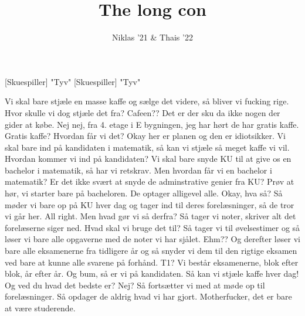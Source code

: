 \documentclass[a4paper,11pt]{article}
\title{The long con}
\author{Niklas '21 \& Thais '22}
\begin{document}
\maketitle

\begin{roles}
[Skuespiller] "Tyv"
[Skuespiller] "Tyv"
\end{roles}

\begin{sketch}
 Vi skal bare stjæle en masse kaffe og sælge det videre, så bliver vi fucking rige.
 Hvor skulle vi dog stjæle det fra? Cafeen?? Det er der sku da ikke nogen der gider at købe.
 Nej nej, fra 4. etage i E bygningen, jeg har hørt de har gratis kaffe.
 Gratis kaffe? Hvordan får vi det?
 Okay her er planen og den er idiotsikker. Vi skal bare ind på kandidaten i matematik, så kan vi stjæle så meget kaffe vi vil.
 Hvordan kommer vi ind på kandidaten?
 Vi skal bare snyde KU til at give os en bachelor i matematik, så har vi retskrav.
 Men hvordan får vi en bachelor i matematik? Er det ikke svært at snyde de adminstrative genier fra KU?
 Prøv at hør, vi starter bare på bacheloren. De optager alligevel alle.
 Okay, hva så?
 Så møder vi bare op på KU hver dag og tager ind til deres forelæsninger, så de tror vi går her.
 All right. Men hvad gør vi så derfra?
 Så tager vi noter, skriver alt det forelæserne siger ned.
 Hvad skal vi bruge det til?
 Så tager vi til øvelsestimer og så løser vi bare alle opgaverne med de noter vi har sjålet. 
 Ehm?? 
 Og derefter løser vi bare alle eksamenerne fra tidligere år og så snyder vi dem til den rigtige eksamen ved bare at kunne alle svarene på forhånd. 
 T1? 
 Vi består eksamenerne, blok efter blok, år efter år. Og bum, så er vi på kandidaten. Så kan vi stjæle kaffe hver dag! Og ved du hvad det bedste er?
 Nej?
 Så fortsætter vi med at møde op til forelæsninger. Så opdager de aldrig hvad vi har gjort.
 Motherfucker, det er bare at være studerende.
\end{sketch}
\end{document}
